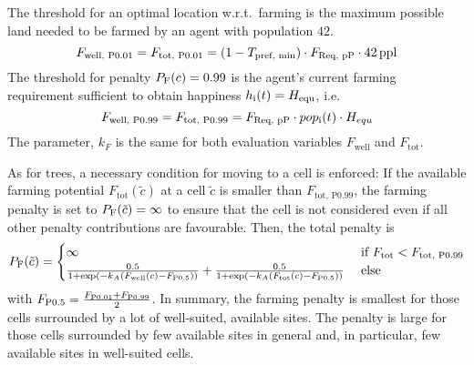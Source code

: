 The threshold for an optimal location w.r.t.\ farming is the maximum possible land needed to be farmed by an agent with population $42$.
\begin{equation}
F_\text{well, P0.01} = F_\text{tot, P0.01} =  (1-T_\text{pref, min})\cdot F_\text{Req, pP} \cdot 42\, {\rm ppl} 
\end{equation}
The threshold for penalty $P_{\rm F}(c)=0.99$ is the agent's current farming requirement sufficient to obtain happiness $h_{\rm i}(t) = H_{\rm equ}$, i.e.\
\begin{equation} 
F_\text{well, P0.99} = F_\text{tot, P0.99} =  F_\text{Req, pP}\cdot pop_{\rm i}(t) \cdot H_{equ}
\end{equation}
The parameter, $k_F$ is the same for both evaluation variables $F_\text{well} $ and $F_\text{tot}$.

As for trees, a necessary condition for moving to a cell is enforced:
 If the available farming potential $F_\text{tot}(\tilde{c})$  at a cell $\tilde{c}$ is smaller than $F_\text{tot, P0.99}$, the farming penalty is set to $P_{\rm F}(\tilde{c}) = \infty$ to ensure that the cell is not considered even if all other penalty contributions are favourable.
Then, the total penalty is 
\begin{equation}
P_{\rm F} (\tilde{c}) = 
\begin{cases} 
\infty & \text{ if } F_\text{tot} < F_\text{tot, P0.99}\\
\frac{0.5}{1+\exp\left( - k_A (F_\text{well}(c)-F_\text{P0.5}) \right)} + \frac{0.5}{1+\exp\left( - k_A (F_\text{tot}(c)-F_\text{P0.5}) \right)} & \text{ else}
\end{cases}
\end{equation}
with $F_\text{P0.5} = \frac{F_{\rm P0.01}+F_{\rm P0.99}}{2}$.
In summary, the farming penalty is smallest for those cells surrounded by a lot of well-suited, available sites.
The penalty is large for those cells surrounded by few available sites in general and, in particular, few available sites in well-suited cells.


